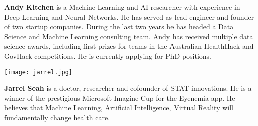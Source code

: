 \documentclass[a4paper,12pt]{spieman}  %
\begin{document}
\begin{spacing}{1}
\begin{minipage}[c]{0.8\textwidth}
	\noindent\textbf{Andy Kitchen} is a Machine Learning and AI researcher
	with experience in Deep Learning and Neural Networks. He has served as
	lead engineer and founder of two startup companies.  During the last
	two years he has headed a Data Science and Machine Learning consulting
	team. Andy has received multiple data science awards, including first
	prizes for teams in the Australian HealthHack and GovHack competitions.
	He is currently applying for PhD positions.

\end{minipage}

\vspace{1\baselineskip}

\noindent
\begin{minipage}[c]{0.2\textwidth}
\texttt{[image: jarrel.jpg]}
\end{minipage}
\begin{minipage}[c]{0.8\textwidth}

	\noindent\textbf{Jarrel Seah} is a doctor, researcher and
	cofounder of STAT innovations. He is a winner of the prestigious
	Microsoft Imagine Cup for the Eyenemia app. He believes that Machine
	Learning, Artificial Intelligence, Virtual Reality will fundamentally
	change health care.

\end{minipage}

\vspace{1\baselineskip}

\listoffigures
\listoftables

\end{spacing}
\end{document}
